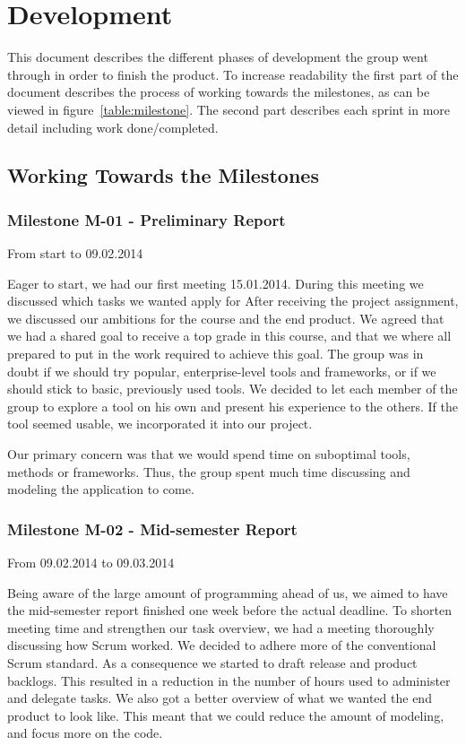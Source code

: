 \chapter{Development}\label{chapter:development}

This document describes the different phases of development the group
went through in order to finish the product. To increase readability
the first part of the document describes the process of working towards the
milestones, as can be viewed in figure~\ref{table:milestone}. The second part
describes each sprint in more detail including work done/completed. 

\section{Working Towards the Milestones}
\subsection{Milestone M-01 - Preliminary Report}
\label{sec:M01}

From start to 09.02.2014

Eager to start, we had our first meeting 15.01.2014. During this meeting we
discussed which tasks we wanted apply for After receiving the project
assignment, we discussed our ambitions for the course and the end product. We
agreed that we had a shared goal to receive a top grade in this course, and
that we where all prepared to put in the work required to achieve this goal.
The group was in doubt if we should try popular, enterprise-level tools and
frameworks, or if we should stick to basic, previously used tools. We decided
to let each member of the group to explore a tool on his own and present his
experience to the others. If the tool seemed usable, we incorporated it into
our project.

Our primary concern was that we would spend time on suboptimal tools, methods
or frameworks. Thus, the group spent much time discussing and modeling the
application to come. 

\pagebreak
\subsection{Milestone M-02 - Mid-semester Report}
\label{sec:M02}
From 09.02.2014 to 09.03.2014

Being aware of the large amount of programming ahead of us, we aimed to have
the mid-semester report finished one week before the actual deadline. To
shorten meeting time and strengthen our task overview, we had a meeting
thoroughly discussing how Scrum worked. We decided to adhere more of the
conventional Scrum standard. As a consequence we started to draft release and
product backlogs. This resulted in a reduction in the number of hours used to
administer and delegate tasks. We also got a better overview of what we wanted
the end product to look like. This meant that we could reduce the amount of
modeling, and focus more on the code. 

